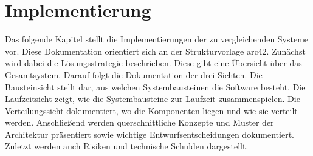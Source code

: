 \chapter{Implementierung}

Das folgende Kapitel stellt die Implementierungen der zu vergleichenden Systeme vor. Diese Dokumentation orientiert sich an der Strukturvorlage arc42\autocite{starke2007strukturvorlage}. Zunächst wird dabei die Lösungsstrategie beschrieben. Diese gibt eine Übersicht über das Gesamtsystem. Darauf folgt die Dokumentation der drei Sichten. Die Bausteinsicht stellt dar, aus welchen Systembausteinen die Software besteht. Die Laufzeitsicht zeigt, wie die Systembausteine zur Laufzeit zusammenspielen. Die Verteilungssicht dokumentiert, wo die Komponenten liegen und wie sie verteilt werden. Anschließend werden querschnittliche Konzepte und Muster der Architektur präsentiert sowie wichtige Entwurfsentscheidungen dokumentiert. Zuletzt werden auch Risiken und technische Schulden dargestellt.